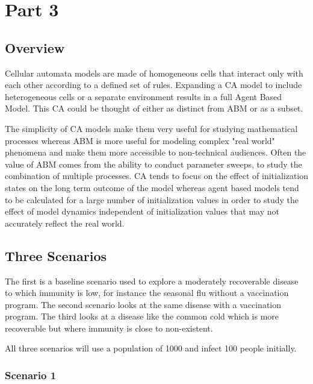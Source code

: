 \documentclass[11pt]{article} %
\begin{document}

\section{Part 3}

\subsection{Overview}

Cellular automata models are made of homogeneous cells that interact only with each other according to a defined set of rules. Expanding a CA model to include heterogeneous cells or a separate environment results in a full Agent Based Model. This CA could be thought of either as distinct from ABM or as a subset. 
 
The simplicity of CA models make them very useful for studying mathematical processes whereas ABM is more useful for modeling complex "real world" phenomena and make them more accessible to non-technical audiences. Often the value of ABM comes from the ability to conduct parameter sweeps, to study the combination of multiple processes. CA tends to focus on the effect of initialization states on the long term outcome of the model whereas agent based models tend to be calculated for a large number of initialization values in order to study the effect of model dynamics independent of initialization values that may not accurately reflect the real world. 

\subsection{Three Scenarios}

The first is a baseline scenario used to explore a moderately recoverable disease to which immunity is low, for instance the seasonal flu without a vaccination program. The second scenario looks at the same disease with a vaccination program. The third looks at a disease like the common cold which is more recoverable but where immunity is close to non-existent. 

All three scenarios will use a population of 1000 and infect 100 people initially. 

\subsubsection{Scenario 1}
\end{document}
